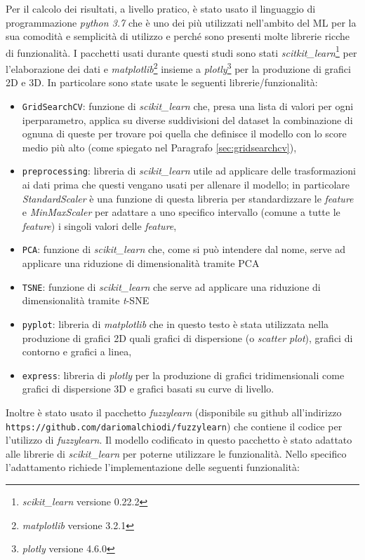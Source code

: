 \documentclass[12pt,italian]{report}
\begin{document}
Per il calcolo dei risultati, a livello pratico, è stato usato il linguaggio di programmazione \emph{python 3.7} che è uno dei più utilizzati nell'ambito del ML per la sua comodità e semplicità di utilizzo e perché sono presenti molte librerie ricche di funzionalità. I pacchetti usati durante questi studi sono stati \emph{scitkit\_learn}\footnote{\emph{scikit\_learn} versione 0.22.2} per l'elaborazione dei dati e \emph{matplotlib}\footnote{\emph{matplotlib} versione 3.2.1} insieme a \emph{plotly}\footnote{\emph{plotly} versione 4.6.0} per la produzione di grafici 2D e 3D. In particolare sono state usate le seguenti librerie/funzionalità:
\begin{itemize}
	\item{\texttt{GridSearchCV}: funzione di \emph{scikit\_learn} che, presa una lista di valori per ogni iperparametro, applica su diverse suddivisioni del dataset la combinazione di ognuna di queste per trovare poi quella che definisce il modello con lo score medio più alto (come spiegato nel Paragrafo \ref{sec:gridsearchcv}),}
	\item{\texttt{preprocessing}: libreria di \emph{scikit\_learn} utile ad applicare delle trasformazioni ai dati prima che questi vengano usati per allenare il modello; in particolare \emph{StandardScaler} è una funzione di questa libreria per standardizzare le \emph{feature} e \emph{MinMaxScaler} per adattare a uno specifico intervallo (comune a tutte le \emph{feature}) i singoli valori delle \emph{feature},}
	\item{\texttt{PCA}: funzione di \emph{scikit\_learn} che, come si può intendere dal nome, serve ad applicare una riduzione di dimensionalità tramite PCA}
	\item{\texttt{TSNE}: funzione di \emph{scikit\_learn} che serve ad applicare una riduzione di dimensionalità tramite \emph{t}-SNE}
\item{\texttt{pyplot}: libreria di \emph{matplotlib} che in questo testo è stata utilizzata nella produzione di grafici 2D quali grafici di dispersione (o \emph{scatter plot}), grafici di contorno e grafici a linea,}
\item{\texttt{express}: libreria di \emph{plotly} per la produzione di grafici tridimensionali come grafici di dispersione 3D e grafici basati su curve di livello.}
\end{itemize}
Inoltre è stato usato il pacchetto \emph{fuzzylearn} (disponibile su github all'indirizzo \texttt{https://github.com/dariomalchiodi/fuzzylearn}) che contiene il codice per l'utilizzo di \emph{fuzzylearn}. Il modello codificato in questo pacchetto è stato adattato alle librerie di \emph{scikit\_learn} per poterne utilizzare le funzionalità. Nello specifico l'adattamento richiede l'implementazione delle seguenti funzionalità:
\end{document}
